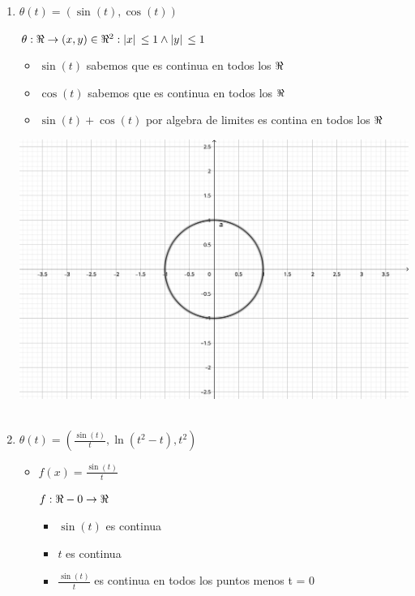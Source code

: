 \documentclass[../practica_03.tex]{subfiles}
\begin{document}
    \begin{enumerate}
        \item $\theta(t) = (\sin(t), \cos(t))$

            $\theta: \real \rightarrow (x,y) \in \real^2 : \abs*{x} \leq 1 \wedge \abs*{y} \leq 1$

            \begin{itemize}
                \item $ \sin(t) $ sabemos que es continua en todos los $\real$
                \item $ \cos(t) $ sabemos que es continua en todos los $\real$
                \item $ \sin(t) + \cos(t) $ por algebra de limites es contina en todos los $\real$
            \end{itemize}

            \includegraphics[scale=0.8]{ej01/resources/1a.png} $ $

        \item $\theta(t) = (\frac{\sin(t)}{t}, \ln(t^2-t), t^2)$

            \begin{itemize}
                \item $f(x) = \frac{\sin(t)}{t}$

                    $f: \real - {0} \rightarrow \real$

                    \begin{itemize}
                        \item $ \sin(t) $ es continua
                        \item $ t $ es continua
                        \item $ \frac{\sin(t)}{t} $ es continua en todos los puntos menos t = 0
                    \end{itemize}


\end{itemize}
\end{enumerate}
\end{document}
